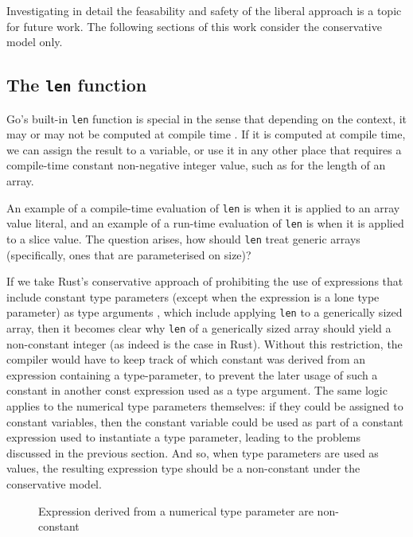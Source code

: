 Investigating in detail the feasability and safety of the liberal approach
is a topic for future work. The following sections of this work consider the
conservative model only.

\subsection{The \texttt{len} function}

Go's built-in \texttt{len} function is special in the sense that depending on
the context, it may or may not be computed at compile time \autocite{spec}. If
it is computed at compile time, we can assign the result to a 
variable, or use it in any other place that requires a compile-time constant
non-negative integer value, such as for the length of an array.

An example of a compile-time evaluation of \texttt{len} is when it is applied to
an array value literal, and an example of a run-time evaluation of \texttt{len}
is when it is applied to a slice value. The question arises, how should
\texttt{len} treat generic arrays (specifically, ones that are parameterised on
size)?

If we take Rust's conservative approach of prohibiting the use of expressions
that include constant type parameters (except when the expression is a lone type
parameter) as type arguments \autocite{rustConstBlog}, which include applying
\texttt{len} to a generically sized array, then it becomes clear why
\texttt{len} of a generically sized array should yield a non-constant integer
(as indeed is the case in Rust). Without this restriction, the compiler would
have to keep track of which constant was derived from an expression containing a
type-parameter, to prevent the later usage of such a constant in another const
expression used as a type argument. The same logic applies to the numerical type
parameters themselves: if they could be assigned to constant variables, then the
constant variable could be used as part of a constant expression used to
instantiate a  type parameter, leading to the problems discussed in
the previous section. And so, when  type parameters are used as
values, the resulting expression type should be a non-constant  under
the conservative model.

\begin{figure}
    \caption{Expression derived from a numerical type parameter are non-constant}
\end{figure}

